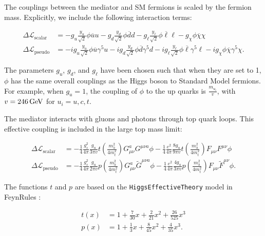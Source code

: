\documentclass[showpacs,preprintnumbers,amsmath,amssymb]{revtex4}
\def\GeV{\,{\rm GeV}}
\def\bar{\overline}
\begin{document}
The couplings between the mediator and SM fermions is scaled by the fermion mass. Explicitly, we include the following interaction terms:

\begin{align}
\Delta\mathcal{L}_\text{scalar} 
&= 
- g_u \frac{y_u}{\sqrt{2}} \phi \bar{u}u 
- g_d \frac{y_d}{\sqrt{2}} \phi \bar{d}d 
- g_\ell \frac{y_\ell}{\sqrt{2}} \phi \bar{\ell}\ell 
- g_{\chi} \phi \bar{\chi}\chi
\label{eq:L:scalar}
\\
\Delta\mathcal{L}_\text{pseudo} 
&= 
- ig_u \frac{y_u}{\sqrt{2}} \phi \bar{u}\gamma^5 u 
- ig_d \frac{y_d}{\sqrt{2}} \phi \bar{d}\gamma^5 d 
- ig_\ell \frac{y_\ell}{\sqrt{2}} \phi \bar{\ell}\gamma^5 \ell 
- ig_{\chi} \phi \bar{\chi}\gamma^5\chi.
\label{eq:L:pseudo}
\end{align}
%

The parameters $g_u$, $g_d$, and $g_\ell$ have been chosen such that when they are set to 1, $\phi$ has the same overall couplings as the Higgs boson to Standard Model fermions. For example, when $g_u = 1$, the coupling of $\phi$ to the up quarks is $\frac{m_{u_i}}{v}$, with $v=246 \GeV$ for $u_i = u,c,t$.

The mediator interacts with gluons and photons through top quark loops. This effective coupling is included in the large top mass limit:

\begin{align}
\Delta\mathcal{L}_\text{scalar} 
&=
-\frac{1}{4} \frac{g_s^2}{4\pi} \frac{g_u}{3\pi v} t\left( \frac{m_h^2}{4m_t^2}\right) G_{\mu \nu}^a G^{\mu \nu a} \phi
-\frac{1}{4} \frac{e^2}{4\pi} \frac{8 g_u}{9 \pi v} t\left(\frac{m_h^2}{4m_t^2}\right) F_{\mu \nu} F^{\mu \nu} \phi
\label{eq:L:scalarHEFT}
\\
\Delta\mathcal{L}_\text{pseudo} 
&=
-\frac{1}{4} \frac{g_s^2}{4\pi} \frac{g_u}{2\pi v} p\left( \frac{m_h^2}{4m_t^2}\right) G_{\mu \nu}^a \tilde{G}^{\mu \nu a} \phi
-\frac{1}{4} \frac{e^2}{4\pi} \frac{4 g_u}{3\pi v} p\left( \frac{m_h^2}{4m_t^2}\right) F_{\mu \nu} \tilde{F}^{\mu \nu} \phi.
\label{eq:L:pseudoHEFT}
\end{align}
%

The functions $t$ and $p$ are based on the \texttt{HiggsEffectiveTheory} model in FeynRules \cite{HEFT}:
%

\begin{align}
t(x)&= 1 + \frac{7}{30}x + \frac{2}{21}x^2 + \frac{26}{525}x^3
\\
p(x)&= 1 + \frac{1}{3}x + \frac{8}{45}x^2 + \frac{4}{35}x^3.
\end{align}
\end{document}
